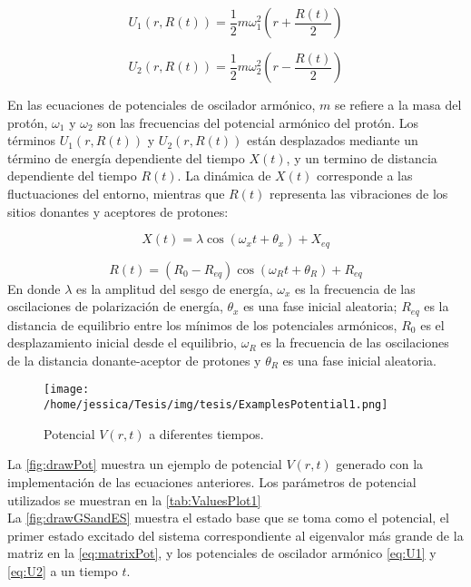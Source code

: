 \begin{equation}
  \label{eq:U1}
  U_1(r,R(t))=\frac{1}{2}m\omega_1^2\left( r + \frac{R(t)}{2} \right)
\end{equation}

\begin{equation}
  \label{eq:U2}
  U_2(r,R(t))=\frac{1}{2}m\omega_2^2\left( r - \frac{R(t)}{2} \right)
\end{equation}

En las ecuaciones de potenciales de oscilador armónico, $m$ se refiere a la masa del protón, $\omega_1$ y $\omega_2$  son las frecuencias del potencial armónico del protón. Los términos $U_1(r,R(t))$ y  $U_2(r,R(t))$ están desplazados mediante un término de energía dependiente del tiempo $X(t)$, y un termino de distancia dependiente del tiempo $R(t)$. La dinámica de $X(t)$ corresponde a las fluctuaciones del entorno, mientras que $R(t)$ representa las vibraciones de los sitios donantes y aceptores de protones: \cite{Main:2021}

\begin{equation}
  \label{eq:X(t)}
  X(t)=\lambda \cos(\omega_xt+\theta_x)+X_{eq}
\end{equation}

\begin{equation}
  \label{eq:R(t)}
  R(t)=(R_0-R_{eq})\cos(\omega_Rt + \theta_R) + R_{eq}
\end{equation}
En donde $\lambda$ es la amplitud del sesgo de energía, $\omega_x$ es la frecuencia de las oscilaciones de polarización de energía, $\theta_x$ es una fase inicial aleatoria; $R_{eq}$ es la distancia de equilibrio entre los mínimos de los potenciales armónicos, $R_0$ es el desplazamiento inicial desde el equilibrio, $\omega_R$ es la frecuencia de las oscilaciones de la distancia donante-aceptor de protones y $\theta_R$ es una fase inicial aleatoria. \cite{Main:2021}



\begin{figure}[ht]
  \centering
  \texttt{[image: /home/jessica/Tesis/img/tesis/ExamplesPotential1.png]}
  \caption{Potencial $V(r,t)$ a diferentes tiempos.}
  \label{fig:drawPot}
\end{figure}

La \autoref{fig:drawPot} muestra un ejemplo de potencial $V(r,t)$ generado con la implementación de las ecuaciones anteriores. Los parámetros de potencial utilizados se muestran en la \autoref{tab:ValuesPlot1}
\\
La \autoref{fig:drawGSandES} muestra el estado base que se toma como el potencial, el primer estado excitado del sistema correspondiente al eigenvalor más grande de la matriz en la \autoref{eq:matrixPot}, y los potenciales de oscilador armónico \autoref{eq:U1} y \autoref{eq:U2} a un tiempo $t$.

